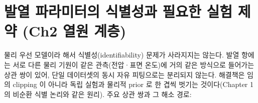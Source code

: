 \section{발열 파라미터의 식별성과 필요한 실험 제약 (Ch2 열원 계층)}\label{sec:ch6_ch2_ident}
물리 우선 모델이라 해서 식별성(identifiability) 문제가 사라지지는 않는다. 발열 항에는 서로 다른 물리
기원이 같은 관측(전압·표면 온도)에 거의 같은 방식으로 들어가는 상관 쌍이 있어, 단일 데이터셋의 동시 자유
피팅으로는 분리되지 않는다. 해결책은 임의 clipping 이 아니라 독립 실험과 물리적 prior 로 한 겹씩 벗기는
것이다(Chapter 1 의 비순환 식별 논리와 같은 원리). 주요 상관 쌍과 그 해소 경로:

